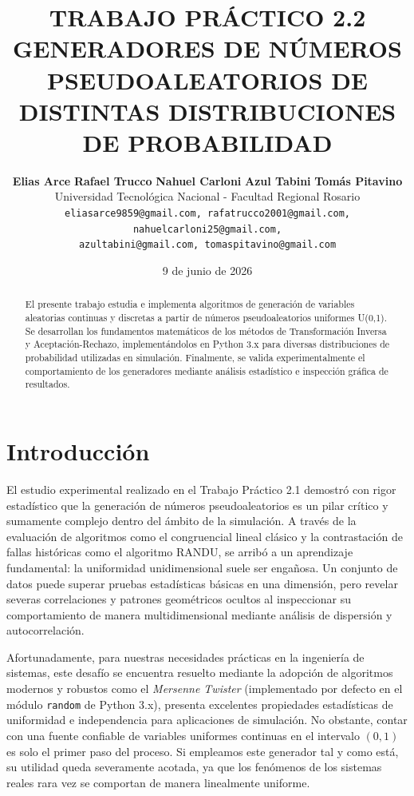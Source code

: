 \documentclass{article}
\title{TRABAJO PRÁCTICO 2.2\\
\Large GENERADORES DE NÚMEROS PSEUDOALEATORIOS DE\\ DISTINTAS DISTRIBUCIONES DE PROBABILIDAD}
\author{
  \textbf{Elias Arce} \quad \textbf{Rafael Trucco} \quad \textbf{Nahuel Carloni} \quad \textbf{Azul Tabini} \quad \textbf{Tomás Pitavino} \\
  \small Universidad Tecnológica Nacional - Facultad Regional Rosario \\
  \small \texttt{eliasarce9859@gmail.com, rafatrucco2001@gmail.com, nahuelcarloni25@gmail.com,} \\
  \small \texttt{azultabini@gmail.com, tomaspitavino@gmail.com}
}
\date{9 de junio de 2026}
\begin{document}
\maketitle

\begin{abstract}
El presente trabajo estudia e implementa algoritmos de generación de variables aleatorias continuas y discretas a partir de números pseudoaleatorios uniformes U(0,1). Se desarrollan los fundamentos matemáticos de los métodos de Transformación Inversa y Aceptación-Rechazo, implementándolos en Python 3.x para diversas distribuciones de probabilidad utilizadas en simulación. Finalmente, se valida experimentalmente el comportamiento de los generadores mediante análisis estadístico e inspección gráfica de resultados.
\end{abstract}



\section{Introducción}

El estudio experimental realizado en el Trabajo Práctico 2.1 demostró con rigor estadístico que la generación de números pseudoaleatorios es un pilar crítico y sumamente complejo dentro del ámbito de la simulación. A través de la evaluación de algoritmos como el congruencial lineal clásico y la contrastación de fallas históricas como el algoritmo RANDU, se arribó a un aprendizaje fundamental: la uniformidad unidimensional suele ser engañosa. Un conjunto de datos puede superar pruebas estadísticas básicas en una dimensión, pero revelar severas correlaciones y patrones geométricos ocultos al inspeccionar su comportamiento de manera multidimensional mediante análisis de dispersión y autocorrelación.

Afortunadamente, para nuestras necesidades prácticas en la ingeniería de sistemas, este desafío se encuentra resuelto mediante la adopción de algoritmos modernos y robustos como el \textit{Mersenne Twister} (implementado por defecto en el módulo \texttt{random} de Python 3.x), presenta excelentes propiedades estadísticas de uniformidad e independencia para aplicaciones de simulación. No obstante, contar con una fuente confiable de variables uniformes continuas en el intervalo $(0,1)$ es solo el primer paso del proceso. Si empleamos este generador tal y como está, su utilidad queda severamente acotada, ya que los fenómenos de los sistemas reales rara vez se comportan de manera linealmente uniforme.
\end{document}
